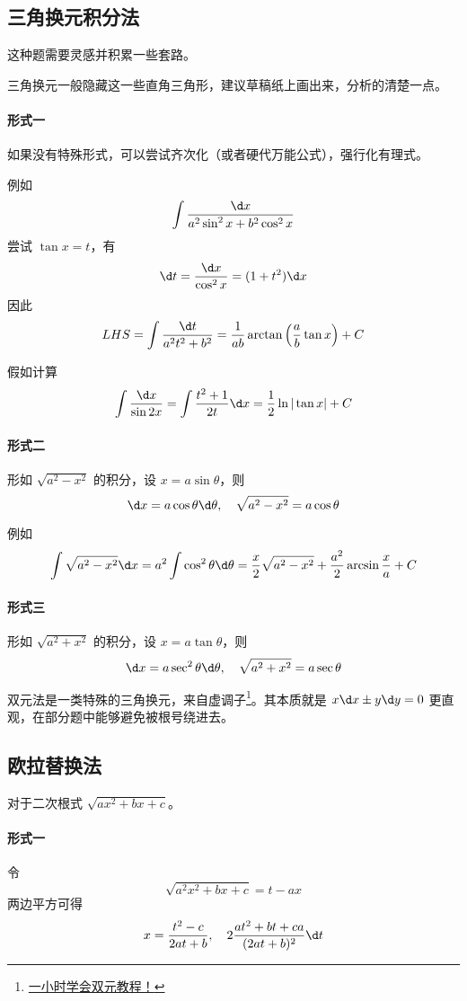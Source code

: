 \subsection{三角换元积分法}

这种题需要灵感并积累一些套路。

三角换元一般隐藏这一些直角三角形，建议草稿纸上画出来，分析的清楚一点。

\paragraph{形式一} 如果没有特殊形式，可以尝试齐次化（或者硬代万能公式），强行化有理式。

例如
\[ \int \frac{\d x}{a^2 \sin^2 x + b^2 \cos^2 x} \]
尝试 $\tan x = t$，有
\[ \d t = \frac{\d x}{\cos^2 x} = (1 + t^2) \d x \]
因此
\[ LHS = \int \frac{\d t}{a^2 t^2 + b^2} = \frac{1}{ab} \arctan \left( \frac{a}{b} \tan x \right) + C \]


假如计算
\[ \int \frac{\d x}{\sin 2x} = \int \frac{t^2+1}{2t} \d x = \frac{1}{2} \ln | \tan x| + C \]


\paragraph{形式二} 形如 $\sqrt{a^2 - x^2}$ 的积分，设 $x = a \sin \theta$，则
\[ \d x = a \cos \theta \d \theta, \quad \sqrt{a^2 - x^2} = a \cos \theta \]

例如
\[ \int \sqrt{a^2 - x^2} \d x = a^2 \int \cos^2 \theta \d \theta = \frac{x}{2}\sqrt{a^2 - x^2} + \frac{a^2}{2} \arcsin \frac{x}{a} + C \]

\paragraph{形式三} 形如 $\sqrt{a^2 + x^2}$ 的积分，设 $x = a \tan \theta$，则
\[ \d x = a \sec^2 \theta \d \theta, \quad \sqrt{a^2+x^2} = a \sec \theta \]

双元法是一类特殊的三角换元，来自虚调子\footnote{\href{https://zhuanlan.zhihu.com/p/443599480}{一小时学会双元教程！}}。其本质就是 $x\d x \pm y \d y = 0$ 更直观，在部分题中能够避免被根号绕进去。

\subsection{欧拉替换法}

对于二次根式 $\sqrt{a x^2 + b x + c}$。

\paragraph{形式一} 令
\[ \sqrt{a^2x^2+bx+c} = t - ax \]
两边平方可得
\[ x = \frac{t^2 - c}{2at + b}, \quad 2\frac{at^2 + bt + ca}{(2at+b)^2} \d t \]

